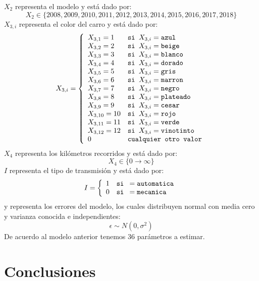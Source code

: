 \documentclass[a4paper]{article}
\begin{document}
$X_2$ representa el modelo y está dado por:
\begin{equation}
X_2\in{\lbrace 2008, 2009, 2010, 2011, 2012, 2013, 2014, 2015, 2016, 2017, 2018 \rbrace}
\end{equation}
$X_{3,i}$ representa el color del carro y está dado por:
\begin{equation}
X_{3,i} = \left\lbrace
\begin{array}{ll}
X_{3,1} = 1 & \verb!si ! X_{3,i} = \verb!azul!\\
X_{3,2} = 2 & \verb!si !X_{3,i} = \verb!beige!\\
X_{3,3} = 3 & \verb!si !X_{3,i} = \verb!blanco!\\
X_{3,4} = 4 & \verb!si !X_{3,i} = \verb!dorado!\\
X_{3,5} = 5 & \verb!si !X_{3,i} = \verb!gris!\\
X_{3,6} = 6 & \verb!si !X_{3,i} = \verb!marron!\\
X_{3,7} = 7 & \verb!si !X_{3,i} = \verb!negro!\\
X_{3,8} = 8 & \verb!si !X_{3,i} = \verb!plateado!\\
X_{3,9} = 9 & \verb!si !X_{3,i} = \verb!cesar!\\
X_{3,10} = 10 & \verb!si !X_{3,i} = \verb!rojo!\\
X_{3,11} = 11 & \verb!si !X_{3,i} = \verb!verde!\\
X_{3,12} = 12 & \verb!si !X_{3,i} = \verb!vinotinto!\\
0 & \verb!cualquier otro valor!\\
\end{array}
\right.
\end{equation}
$X_4$ representa los kilómetros recorridos y está dado por:
\begin{equation}
X_4\in{\lbrace 0 \to \infty \rbrace}
\end{equation}
$I$ representa el tipo de transmisión y está dado por:
\begin{equation}
I = \left\lbrace
\begin{array}{ll}
1 & \verb!si ! = \verb!automatica!\\
0 & \verb!si ! = \verb!mecanica!\\
\end{array}
\right.
\end{equation}
y representa los errores del modelo, los cuales distribuyen normal con media cero y varianza conocida e independientes:
\begin{equation}
\epsilon \sim N(0, \sigma^2)
\end{equation}
De acuerdo al modelo anterior tenemos 36 parámetros a estimar.


\section{Conclusiones}



\end{document}
